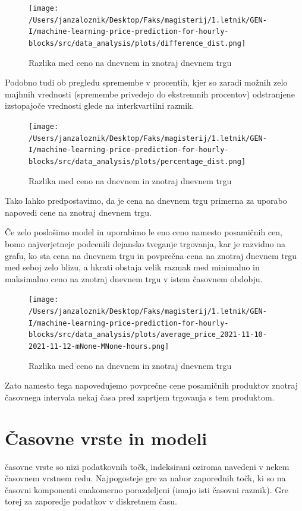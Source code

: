 \documentclass[12pt,a4paper]{amsart}
\theoremstyle{definition} %
\theoremstyle{plain} %
\begin{document}
\begin{figure}[h]
    \centering
    \texttt{[image: /Users/janzaloznik/Desktop/Faks/magisterij/1.letnik/GEN-I/machine-learning-price-prediction-for-hourly-blocks/src/data\_analysis/plots/difference\_dist.png]}
    \caption{Razlika med ceno na dnevnem in znotraj dnevnem trgu}
    \label{fig:Razlika}
\end{figure}

Podobno tudi ob pregledu spremembe v procentih, kjer so zaradi možnih zelo majhnih vrednosti (spremembe privedejo do ekstremnih procentov) odstranjene izstopajoče vrednosti glede na interkvartilni razmik.

\begin{figure}[h]
    \centering
    \texttt{[image: /Users/janzaloznik/Desktop/Faks/magisterij/1.letnik/GEN-I/machine-learning-price-prediction-for-hourly-blocks/src/data\_analysis/plots/percentage\_dist.png]}
    \caption{Razlika med ceno na dnevnem in znotraj dnevnem trgu}
    \label{fig:Razlika}
\end{figure}

\pagebreak
Tako lahko predpostavimo, da je cena na dnevnem trgu primerna za uporabo napovedi cene na znotraj dnevnem trgu.

Če zelo poslošimo model in uporabimo le eno ceno namesto posamičnih cen, bomo najverjetneje podcenili dejansko tveganje trgovanja, kar je razvidno na grafu, ko sta cena na dnevnem trgu in povprečna cena na znotraj dnevnem trgu med seboj zelo blizu, a hkrati obstaja velik razmak med minimalno in maksimalno ceno na znotraj dnevnem trgu v istem časovnem obdobju.

\begin{figure}[h]
    \centering
    \texttt{[image: /Users/janzaloznik/Desktop/Faks/magisterij/1.letnik/GEN-I/machine-learning-price-prediction-for-hourly-blocks/src/data\_analysis/plots/average\_price\_2021-11-10-2021-11-12-mNone-MNone-hours.png]}
    \caption{Razlika med ceno na dnevnem in znotraj dnevnem trgu}
    \label{fig:Razlika}
\end{figure}

Zato namesto tega napovedujemo povprečne cene posamičnih produktov znotraj časovnega intervala nekaj časa pred zaprtjem trgovanja s tem produktom.


\section{Časovne vrste in modeli}

časovne vrste so nizi podatkovnih točk, indeksirani oziroma navedeni v nekem časovnem vrstnem redu. 
Najpogosteje gre za nabor zaporednih točk, ki so na časovni komponenti enakomerno porazdeljeni (imajo isti časovni razmik). Gre torej za zaporedje podatkov v diskretnem času.
\end{document}

